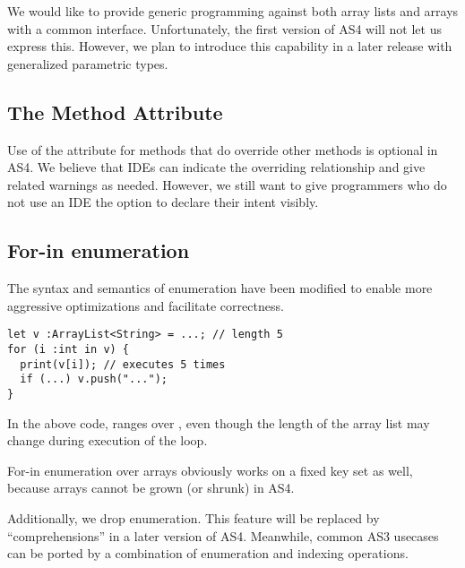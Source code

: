 We would like to provide generic programming against both array lists and arrays
with a common interface. Unfortunately, the first version of AS4 will not let us
express this. However, we plan to introduce this capability in a later release
with generalized parametric types.

\subsection{The  Method Attribute}
Use of the  attribute for methods that do override other methods
is optional in  AS4. We believe that IDEs can indicate the overriding
relationship and give related warnings as needed. However, we still want to give
programmers who do not use an IDE the option to declare their intent visibly.

\subsection{For-in enumeration}

The syntax and semantics of  enumeration have been modified to enable more
aggressive optimizations and facilitate correctness.

\begin{verbatim}
let v :ArrayList<String> = ...; // length 5
for (i :int in v) {
  print(v[i]); // executes 5 times
  if (...) v.push("...");
}
\end{verbatim}

In the above code,  ranges over , even though the
length of the array list may change during execution of the loop.

For-in enumeration over arrays obviously works on a fixed key set
as well, because arrays cannot be grown (or shrunk) in AS4.

Additionally, we drop  enumeration. This feature
will be replaced by ``comprehensions'' in a later version of AS4.
Meanwhile, common AS3 usecases can be ported by a combination of 
enumeration and indexing operations.

\pagebreak
